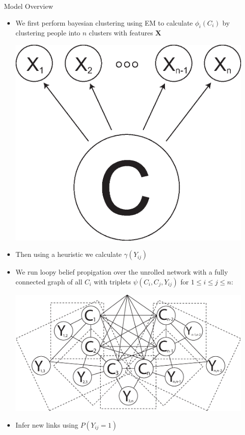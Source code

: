 \message{ !name(poster.tex)}\documentclass[final,t]{beamer}
\begin{document}
\begin{frame}{}
\begin{columns}[t]
\begin{column}{.3\linewidth}
      \begin{block}{Model Overview}
        \begin{itemize}
        \item We first perform \alert{bayesian clustering} using EM to calculate
        $\phi_i(C_i)$ by clustering people into $n$ clusters with features $\mathbf{X}$ 
           \begin{center}
           \includegraphics[width=0.2\linewidth]{images/naivebayes.eps}\\[1ex]
           \end{center}
         \item Then using a heuristic we calculate $\gamma(Y_{ij})$
           \item We run \alert{loopy belief propigation} over the unrolled
             network with a fully connected graph of all $C_i$ with
             triplets $\psi(C_i, C_j, Y_{ij})$ for $1 \le i \le j \le
             n$:
            \begin{center}
              \includegraphics[width=0.6\linewidth]{images/unrolled.eps}\\[1ex]
              \end{center}
             \item Infer new links using $P(Y_{ij} = 1)$
        \end{itemize}
      \end{block}
      


    \end{column}
    \begin{column}{.3\linewidth}
      




\end{column}
\end{columns}
\end{frame}
\end{document}
